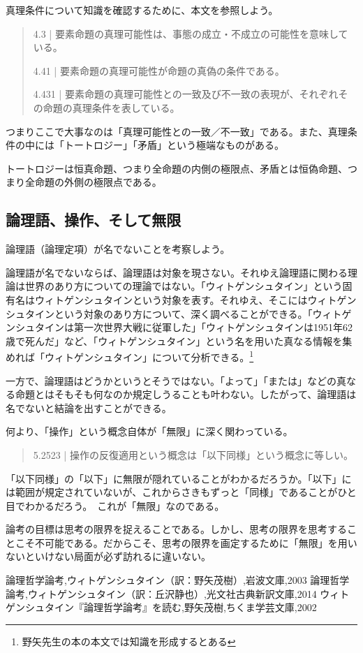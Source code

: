 \documentclass[a4paper,onecolumn,openany,article]{jsarticle}
\begin{document}
真理条件について知識を確認するために、本文を参照しよう。

\begin{quote}
  4.3 | 要素命題の真理可能性は、事態の成立・不成立の可能性を意味している。

  4.41 | 要素命題の真理可能性が命題の真偽の条件である。

  4.431 | 要素命題の真理可能性との一致及び不一致の表現が、それぞれその命題の真理条件を表している。
\end{quote}

つまりここで大事なのは「真理可能性との一致／不一致」である。また、真理条件の中には「トートロジー」「矛盾」という極端なものがある。

トートロジーは恒真命題、つまり全命題の内側の極限点、矛盾とは恒偽命題、つまり全命題の外側の極限点である。

\subsection{論理語、操作、そして無限}

論理語（論理定項）が名でないことを考察しよう。

論理語が名でないならば、論理語は対象を現さない。それゆえ論理語に関わる理論は世界のあり方についての理論ではない。「ウィトゲンシュタイン」という固有名はウィトゲンシュタインという対象を表す。それゆえ、そこにはウィトゲンシュタインという対象のあり方について、深く調べることができる。「ウィトゲンシュタインは第一次世界大戦に従軍した」「ウィトゲンシュタインは1951年62歳で死んだ」など、「ウィトゲンシュタイン」という名を用いた真なる情報を集めれば「ウィトゲンシュタイン」について分析できる。\footnote{野矢先生の本の本文では知識を形成するとある}

一方で、論理語はどうかというとそうではない。「よって」「または」などの真なる命題とはそもそも何なのか規定しうることも叶わない。したがって、論理語は名でないと結論を出すことができる。

何より、「操作」という概念自体が「無限」に深く関わっている。

\begin{quote}
  5.2523 | 操作の反復適用という概念は「以下同様」という概念に等しい。
\end{quote}

「以下同様」の「以下」に無限が隠れていることがわかるだろうか。「以下」には範囲が規定されていないが、これからさきもずっと「同様」であることがひと目でわかるだろう。 これが「無限」なのである。

論考の目標は思考の限界を捉えることである。しかし、思考の限界を思考することこそ不可能である。だからこそ、思考の限界を画定するために「無限」を用いないといけない局面が必ず訪れるに違いない。

\begin{thebibliography}{9}
   論理哲学論考,ウィトゲンシュタイン（訳：野矢茂樹）,岩波文庫,2003
   論理哲学論考,ウィトゲンシュタイン（訳：丘沢静也）,光文社古典新訳文庫,2014
   ウィトゲンシュタイン『論理哲学論考』を読む,野矢茂樹,ちくま学芸文庫,2002
\end{thebibliography}
\end{document}
